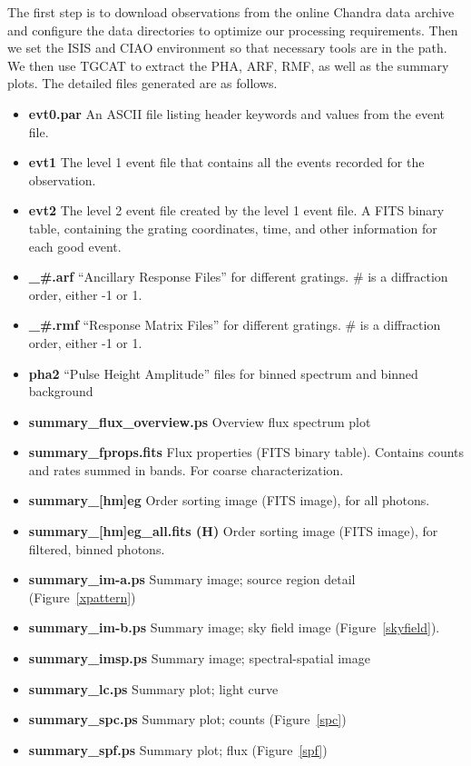 The first step is to download observations from the online Chandra data archive and configure the data directories to optimize our processing requirements. Then we set the ISIS and CIAO environment so that necessary tools are in the path. We then use TGCAT to extract the PHA, ARF, RMF, as well as the summary plots. The detailed files generated are as follows. 
\begin{itemize}
    \item \textbf{evt0.par} An ASCII file listing header keywords and values from the event file.
    \item \textbf{evt1} The level 1 event file that contains all the events recorded for the observation.
    \item \textbf{evt2} The level 2 event file created by the level 1 event file. A FITS binary table, containing the grating coordinates, time, and other information for each good event. 
    \item \textbf{\*\_\#.arf} ``Ancillary Response Files'' for different gratings. \# is a diffraction order, either -1 or 1. 
    \item \textbf{\*\_\#.rmf} ``Response Matrix Files'' for different gratings. \# is a diffraction order, either -1 or 1. 
    \item \textbf{pha2\*} ``Pulse Height Amplitude'' files for binned spectrum and binned background
    \item \textbf{summary\_flux\_overview.ps} Overview flux spectrum plot
    \item \textbf{summary\_fprops.fits} Flux properties (FITS binary table). Contains counts and rates summed in bands. For coarse characterization. 
    \item \textbf{summary\_[hm]eg}  Order sorting image (FITS image), for all photons.
    \item \textbf{summary\_[hm]eg\_all.fits (H)} Order sorting image (FITS image), for filtered, binned photons. 
    \item \textbf{summary\_im-a.ps} Summary image; source region detail (Figure~\ref{xpattern})
    \item \textbf{summary\_im-b.ps} Summary image; sky field image (Figure~\ref{skyfield}).
    \item \textbf{summary\_imsp.ps} Summary image; spectral-spatial image 
    \item \textbf{summary\_lc.ps } Summary plot; light curve 
    \item \textbf{summary\_spc.ps } Summary plot; counts (Figure~\ref{spc})
    \item \textbf{summary\_spf.ps} Summary plot; flux (Figure~\ref{spf})
\end{itemize}

